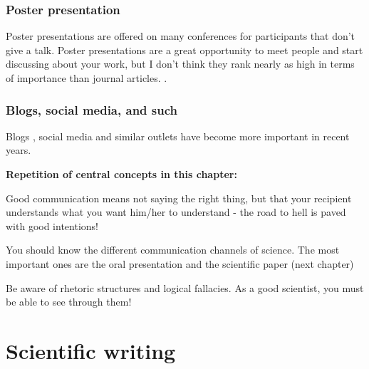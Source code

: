 \documentclass{tufte-book}
\begin{document}
\subsection{Poster presentation}

Poster presentations are offered on many conferences for participants that don't give a talk. Poster presentations are a great opportunity to meet people and start discussing about your work, but I don't think they rank nearly as high in terms of importance than journal articles. .


\subsection{Blogs, social media, and such}

Blogs , social media and similar outlets have become more important in recent years.


\vspace{1cm}
\begin{mdframed}[backgroundcolor=black!10,rightline=false,leftline=false]

\textbf{Repetition of central concepts in this chapter:}

\begin{itemize*}
  \item Good communication means not saying the right thing, but that your recipient understands what you want him/her to understand - the road to hell is paved with good intentions!
  \item You should know the different communication channels of science. The most important ones are the oral presentation and the scientific paper (next chapter)
  \item Be aware of rhetoric structures and logical fallacies. As a good scientist, you must be able to see through them!
\end{itemize*}

\end{mdframed}


\chapter{Scientific writing}
\end{document}
